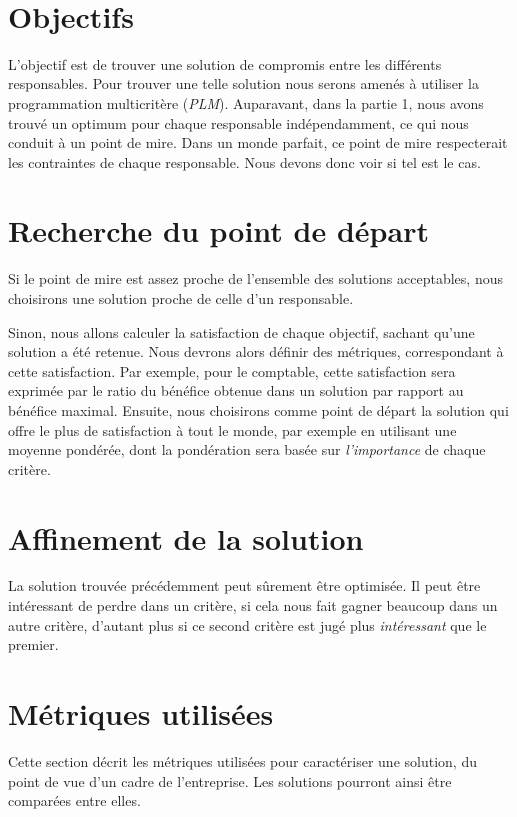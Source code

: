 ~\newpage
{}

\section{Objectifs}
L'objectif est de trouver une solution de compromis entre les différents responsables.
Pour trouver une telle solution nous serons amenés à utiliser la programmation multicritère (\emph{PLM}).
Auparavant, dans la partie 1, nous avons trouvé un optimum pour chaque
responsable indépendam\-ment, ce qui nous conduit à un point de mire. Dans un
monde parfait, ce point de mire respecterait les contraintes de chaque
responsable. Nous devons donc voir si tel est le cas. 

\section{Recherche du point de départ}
Si le point de mire est assez proche de l'ensemble des solutions acceptables,
nous choisirons une solution proche de celle d'un responsable.

Sinon, nous allons calculer la satisfaction de chaque objectif, sachant qu'une
solution a été retenue. Nous devrons alors définir des métriques, correspondant
à cette satisfaction. Par exemple, pour le comptable, cette satisfaction sera
exprimée par le ratio du bénéfice obtenue dans un solution par rapport au
bénéfice maximal.
Ensuite, nous choisirons comme point de départ la solution qui offre le plus de
satisfaction à tout le monde, par exemple en utilisant une moyenne pondérée,
dont la pondération sera basée sur \emph{l'importance} de chaque critère.

\section{Affinement de la solution}
La solution trouvée précédemment peut sûrement être optimisée. Il peut être
intéressant de perdre dans un critère, si cela nous fait gagner beaucoup dans
un autre critère, d'autant plus si ce second critère est jugé plus
\emph{intéressant} que le premier.

\section{Métriques utilisées}
Cette section décrit les métriques utilisées pour caractériser une solution, du
point de vue d'un cadre de l'entreprise. Les solutions pourront ainsi être
comparées entre elles.


